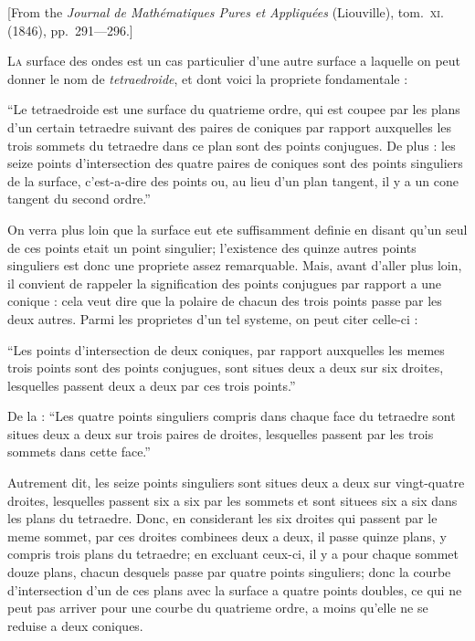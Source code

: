 \documentclass[12pt,a4paper]{article}
\theoremstyle{plain}
\begin{document}
[From the \textit{Journal de Math\'ematiques Pures et Appliqu\'ees} (Liouville), tom.~\textsc{xi}. (1846), pp.~291---296.]

\bigskip

\textsc{La} surface des ondes est un cas particulier d'une autre surface a laquelle on peut donner le nom de \textit{tetraedroide}, et dont voici la propriete fondamentale :

``Le tetraedroide est une surface du quatrieme ordre, qui est coupee par les plans d'un certain tetraedre suivant des paires de coniques par rapport auxquelles les trois sommets du tetraedre dans ce plan sont des points conjugues. De plus : les seize points d'intersection des quatre paires de coniques sont des points singuliers de la surface, c'est-a-dire des points ou, au lieu d'un plan tangent, il y a un cone tangent du second ordre.''

On verra plus loin que la surface eut ete suffisamment definie en disant qu'un seul de ces points etait un point singulier; l'existence des quinze autres points singuliers est donc une propriete assez remarquable. Mais, avant d'aller plus loin, il convient de rappeler la signification des points conjugues par rapport a une conique : cela veut dire que la polaire de chacun des trois points passe par les deux autres. Parmi les proprietes d'un tel systeme, on peut citer celle-ci :

``Les points d'intersection de deux coniques, par rapport auxquelles les memes trois points sont des points conjugues, sont situes deux a deux sur six droites, lesquelles passent deux a deux par ces trois points.''

De la : ``Les quatre points singuliers compris dans chaque face du tetraedre sont situes deux a deux sur trois paires de droites, lesquelles passent par les trois sommets dans cette face.''

Autrement dit, les seize points singuliers sont situes deux a deux sur vingt-quatre droites, lesquelles passent six a six par les sommets et sont situees six a six dans les plans du tetraedre. Donc, en considerant les six droites qui passent par le meme sommet, par ces droites combinees deux a deux, il passe quinze plans, y compris trois plans du tetraedre; en excluant ceux-ci, il y a pour chaque sommet douze plans, chacun desquels passe par quatre points singuliers; donc la courbe d'intersection d'un de ces plans avec la surface a quatre points doubles, ce qui ne peut pas arriver pour une courbe du quatrieme ordre, a moins qu'elle ne se reduise a deux coniques.
\end{document}
